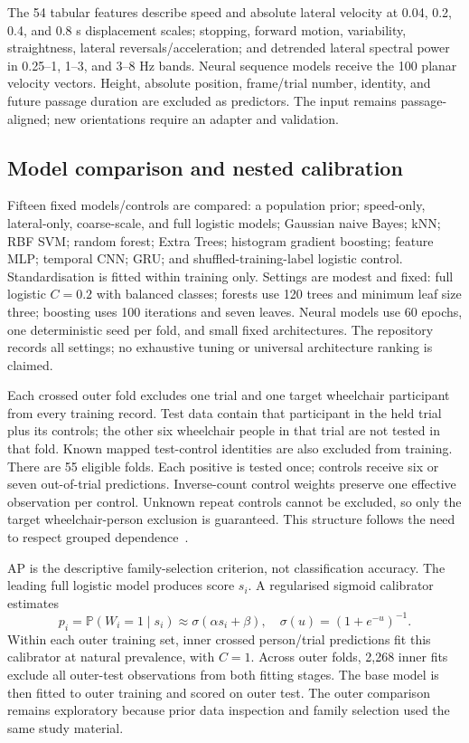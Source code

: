 \documentclass[conference]{IEEEtran}
\newcommand{\Prob}{\mathbb{P}}
\begin{document}
The 54 tabular features describe speed and absolute lateral velocity at 0.04, 0.2, 0.4, and 0.8 s displacement scales; stopping, forward motion, variability, straightness, lateral reversals/acceleration; and detrended lateral spectral power in 0.25--1, 1--3, and 3--8 Hz bands. Neural sequence models receive the 100 planar velocity vectors. Height, absolute position, frame/trial number, identity, and future passage duration are excluded as predictors. The input remains passage-aligned; new orientations require an adapter and validation.

\subsection{Model comparison and nested calibration}
Fifteen fixed models/controls are compared: a population prior; speed-only, lateral-only, coarse-scale, and full logistic models; Gaussian naive Bayes; kNN; RBF SVM; random forest; Extra Trees; histogram gradient boosting; feature MLP; temporal CNN; GRU; and shuffled-training-label logistic control. Standardisation is fitted within training only. Settings are modest and fixed: full logistic $C=0.2$ with balanced classes; forests use 120 trees and minimum leaf size three; boosting uses 100 iterations and seven leaves. Neural models use 60 epochs, one deterministic seed per fold, and small fixed architectures. The repository records all settings; no exhaustive tuning or universal architecture ranking is claimed.

Each crossed outer fold excludes one trial and one target wheelchair participant from every training record. Test data contain that participant in the held trial plus its controls; the other six wheelchair people in that trial are not tested in that fold. Known mapped test-control identities are also excluded from training. There are 55 eligible folds. Each positive is tested once; controls receive six or seven out-of-trial predictions. Inverse-count control weights preserve one effective observation per control. Unknown repeat controls cannot be excluded, so only the target wheelchair-person exclusion is guaranteed. This structure follows the need to respect grouped dependence~\cite{roberts}.

AP is the descriptive family-selection criterion, not classification accuracy. The leading full logistic model produces score $s_i$. A regularised sigmoid calibrator~\cite{calibration} estimates
\begin{equation}
p_i=\Prob(W_i=1\mid s_i)\approx\sigma(\alpha s_i+\beta),\quad \sigma(u)=(1+e^{-u})^{-1}.
\end{equation}
Within each outer training set, inner crossed person/trial predictions fit this calibrator at natural prevalence, with $C=1$. Across outer folds, 2,268 inner fits exclude all outer-test observations from both fitting stages. The base model is then fitted to outer training and scored on outer test. The outer comparison remains exploratory because prior data inspection and family selection used the same study material.
\end{document}
